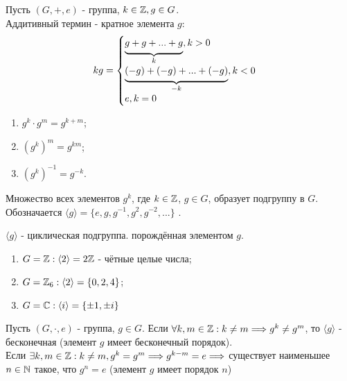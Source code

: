 \begin{definition}
    Пусть $(G, +, e)$ - группа, $k \in \mathbb{Z}, g \in G$.\\
    Аддитивный термин - кратное элемента $g$:
    $$kg =
    \begin{cases} \undermat{k}{g + g + ... + g}, k > 0 \\
        \\
        \undermat{-k}{(-g) + (-g) + ... + (-g)}, k < 0 \\
        \\
        e, k = 0
    \end{cases}$$
\end{definition}
\begin{subtheorem}[Свойства ($k, m \in \Z, g \in G$)] \tab
    \begin{enumerate}
        \item $g^k \cdot g^m = g^{k+m}$;
        \item $(g^k)^m = g^{km}$;
        \item $(g^k)^{-1} = g^{-k}$. 
    \end{enumerate}    
\end{subtheorem}
\begin{subtheorem}
    Множество всех элементов $g^k$, где $k \in \mathbb{Z}$, $g \in G$, образует подгруппу в $G$. Обозначается $\langle g \rangle = \{e, g, g^{-1}, g^2, g^{-2}, ...\}$ .
\end{subtheorem}
\begin{definition}
    $\langle g \rangle$ - циклическая подгруппа. порождённая элементом $g$.
\end{definition}
\begin{examples} \tab
    \begin{enumerate}
        \item $G = \mathbb{Z}: \langle 2 \rangle = 2\mathbb{Z}$ - чётные целые числа;
        \item $G = \mathbb{Z}_6: \langle 2 \rangle = \{0, 2, 4\}$;
        \item $G = \mathbb{C}: \langle i \rangle = \{\pm 1, \pm i\}$ 
    \end{enumerate}
\end{examples}
Пусть $(G, \cdot, e)$ - группа, $g \in G$.
Если $\forall k, m \in \mathbb{Z}: k \neq m \Longrightarrow g^k \neq g^m$, то $\langle g \rangle$ - бесконечная (элемент $g$ имеет бесконечный порядок).\\
Если $\exists k, m \in \mathbb{Z}: k \neq m, g^k = g^m \Longrightarrow g^{k-m} = e \Longrightarrow$ существует наименьшее $n \in \mathbb{N}$ такое, что $g^n = e$ (элемент $g$ имеет порядок $n$)  
